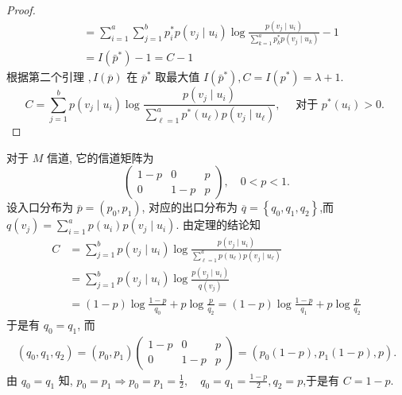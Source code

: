 \begin{proof}
$$\begin{aligned}
& =\sum_{i=1}^{a} \sum_{j=1}^{b} p_{i}^{*} p\left(v_{j} \mid u_{i}\right) \log \frac{p\left(v_{j} \mid u_{i}\right)}{\sum\limits_{k=1}^{a} p_{k}^{*} p\left(v_{j} \mid u_{k}\right)}-1 \\
& =I\left(\bar{p}^{*}\right)-1=C-1
\end{aligned}
$$
根据第二个引理 $, I(\overline{p}) $ 在 $ \overline{p}^{*} $ 取最大值 $ I\left(\bar{p}^{*}\right), C=I\left(p^{*}\right)=\lambda+1 $.
$$
C=\sum_{j=1}^{b} p\left(v_{j} \mid u_{i}\right) \log \frac{p\left(v_{j} \mid u_{i}\right)}{\sum\limits_{\ell=1}^{a} p^{*}\left(u_{\ell}\right) p\left(v_{j} \mid u_{\ell}\right)}, \quad \text { 对于 } p^{*}\left(u_{i}\right)>0 \text {. }
$$
\end{proof}

\begin{example}
对于 $ M $ 信道, 它的信道矩阵为
$$
\left(\begin{array}{ccc}
1-p & 0 & p \\
0 & 1-p & p
\end{array}\right), \quad 0<p<1 .
$$
设入口分布为 $ \overline{p}=\left(p_{0}, p_{1}\right) $, 对应的出口分布为 $ \overline{q}=\left\{q_{0}, q_{1}, q_{2}\right\} $,而 $ q\left(v_{j}\right)=\sum\limits_{i=1}^{a} p\left(u_{i}\right) p\left(v_{j} \mid u_{i}\right) $.
由定理的结论知
$$
\begin{aligned}
C&=\sum_{j=1}^{b} p\left(v_{j} \mid u_{i}\right) \log \frac{p\left(v_{j} \mid u_{i}\right)}{\sum\limits_{\ell=1}^{a} p\left(u_{\ell}\right) p\left(v_{j} \mid u_{\ell}\right)}\\ & =\sum_{j=1}^{b} p\left(v_{j} \mid u_{i}\right) \log \frac{p\left(v_{j} \mid u_{i}\right)}{q\left(v_{j}\right)} \\
& =(1-p) \log \frac{1-p}{q_{0}}+p \log \frac{p}{q_{2}}  =(1-p) \log \frac{1-p}{q_{1}}+p \log \frac{p}{q_{2}}
\end{aligned}
$$
于是有 $ q_{0}=q_{1} $,
而
$$
\begin{aligned}
\left(q_{0}, q_{1}, q_{2}\right)  =\left(p_{0}, p_{1}\right)\left(\begin{array}{ccc}
1-p & 0 & p \\
0 & 1-p & p
\end{array}\right) =\left(p_{0}(1-p), p_{1}(1-p), p\right) .
\end{aligned}
$$
由 $ q_{0}=q_{1} $ 知, $ p_{0}=p_{1} \Rightarrow p_{0}=p_{1}=\frac{1}{2}, \quad q_{0}=q_{1}=\frac{1-p}{2}, q_{2}=p $,于是有 $ C=1-p $.
\end{example}



